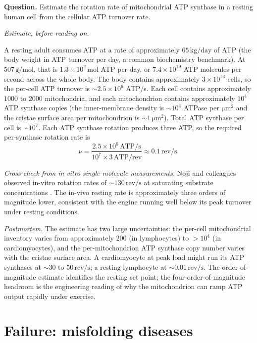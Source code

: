 \begin{estimation}
\textbf{Question.} Estimate the rotation rate of mitochondrial ATP
synthase in a resting human cell from the cellular ATP turnover rate.

\smallskip
\textit{Estimate, before reading on.}

\smallskip
A resting adult consumes ATP at a rate of approximately
$65\,\text{kg/day}$ of ATP (the body weight in ATP turnover per day,
a common biochemistry benchmark). At $507\,\text{g/mol}$, that is
$1.3 \times 10^{2}\,\text{mol}$ ATP per day, or
$7.4 \times 10^{19}$ ATP molecules per second across the whole body.
The body contains approximately $3 \times 10^{13}$ cells, so the
per-cell ATP turnover is $\sim 2.5 \times 10^{6}$ ATP/s. Each cell
contains approximately $1000$ to $2000$ mitochondria, and each
mitochondrion contains approximately $10^4$ ATP synthase copies
(the inner-membrane density is $\sim 10^4$ ATPase per
$\si{\micro\meter}^2$ and the cristae surface area per mitochondrion
is $\sim 1\,\si{\micro\meter}^2$). Total ATP synthase per cell is
$\sim 10^7$. Each ATP synthase rotation produces three ATP, so the
required per-synthase rotation rate is
\[
\nu = \frac{2.5 \times 10^{6}\,\text{ATP/s}}{10^7 \times 3\,\text{ATP/rev}}
\approx 0.1\,\text{rev/s}.
\]

\textit{Cross-check from in-vitro single-molecule measurements.} Noji
and colleagues observed in-vitro rotation rates of
$\sim 130\,\text{rev/s}$ at saturating substrate concentrations
\cite{paper:v6c04-noji-1997}. The in-vivo resting rate is approximately
three orders of magnitude lower, consistent with the engine running
well below its peak turnover under resting conditions.

\smallskip
\textit{Postmortem.} The estimate has two large uncertainties: the
per-cell mitochondrial inventory varies from approximately $200$ (in
lymphocytes) to $> 10^4$ (in cardiomyocytes), and the per-mitochondrion
ATP synthase copy number varies with the cristae surface area. A
cardiomyocyte at peak load might run its ATP synthases at $\sim 30$
to $50\,\text{rev/s}$; a resting lymphocyte at
$\sim 0.01\,\text{rev/s}$. The order-of-magnitude estimate
identifies the resting set point; the four-order-of-magnitude
headroom is the engineering reading of why the mitochondrion can
ramp ATP output rapidly under exercise.
\end{estimation}

\section{Failure: misfolding diseases}

